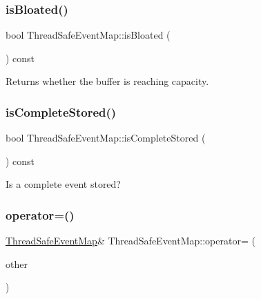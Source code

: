 \subsubsection{\texorpdfstring{is\+Bloated()}{isBloated()}}
{\footnotesize\ttfamily bool Thread\+Safe\+Event\+Map\+::is\+Bloated (\begin{DoxyParamCaption}{ }\end{DoxyParamCaption}) const\hspace{0.3cm}{\ttfamily [inline]}}



Returns whether the buffer is reaching capacity. 

\mbox{\label{class_thread_safe_event_map_a9fb58083137d147811de5b93f991d044}} 
\subsubsection{\texorpdfstring{is\+Complete\+Stored()}{isCompleteStored()}}
{\footnotesize\ttfamily bool Thread\+Safe\+Event\+Map\+::is\+Complete\+Stored (\begin{DoxyParamCaption}{ }\end{DoxyParamCaption}) const\hspace{0.3cm}{\ttfamily [inline]}}



Is a complete event stored? 

\mbox{\label{class_thread_safe_event_map_a1d438208fcc3936dd4384a8a2b55bdf8}} 
\subsubsection{\texorpdfstring{operator=()}{operator=()}\hspace{0.1cm}{\footnotesize\ttfamily [1/2]}}
{\footnotesize\ttfamily \hyperlink{class_thread_safe_event_map}{Thread\+Safe\+Event\+Map}\& Thread\+Safe\+Event\+Map\+::operator= (\begin{DoxyParamCaption}\item[{\hyperlink{class_thread_safe_event_map}{Thread\+Safe\+Event\+Map}}]{other }\end{DoxyParamCaption})\hspace{0.3cm}{\ttfamily [delete]}}

